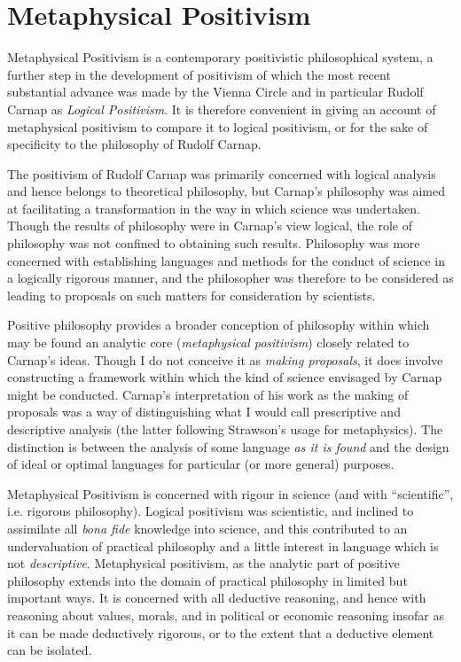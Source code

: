 
\chapter{Metaphysical Positivism}

Metaphysical Positivism is a contemporary positivistic philosophical system, a further step in the development of positivism of which the most recent substantial advance was made by the Vienna Circle and in particular Rudolf Carnap as \emph{Logical Positivism}.
It is therefore convenient in giving an account of metaphysical positivism to compare it to logical positivism, or for the sake of specificity to the philosophy of Rudolf Carnap.

The positivism of Rudolf Carnap was primarily concerned with logical analysis and hence belongs to theoretical philosophy, but Carnap's philosophy was aimed at facilitating a transformation in the way in which science was undertaken.
Though the results of philosophy were in Carnap's view logical, the role of philosophy was not confined to obtaining such results.
Philosophy was more concerned with establishing languages and methods for the conduct of science in a logically rigorous manner, and the philosopher was therefore to be considered as leading to proposals on such matters for consideration by scientists.

Positive philosophy provides a broader conception of philosophy within which may be found an analytic core (\emph{metaphysical positivism}) closely related to Carnap's ideas.
Though I do not conceive it as \emph{making proposals}, it does involve constructing a framework within which  the kind of science envisaged by Carnap might be conducted.
Carnap's interpretation of his work as the making of proposals was a way of distinguishing what I would call prescriptive and descriptive analysis (the latter following Strawson's usage for metaphysics).
The distinction is between the analysis of some language \emph{as it is found} and the design of ideal or optimal languages for particular (or more general) purposes.

Metaphysical Positivism is concerned with rigour in science (and with ``scientific'', i.e. rigorous philosophy).
Logical positivism was scientistic, and inclined to assimilate all {\it bona fide} knowledge into science, and this contributed to an undervaluation of practical philosophy and a little interest in language which is not \emph{descriptive}.
Metaphysical positivism, as the analytic part of positive philosophy extends into the domain of practical philosophy in limited but important ways.
It is concerned with all deductive reasoning, and hence with reasoning about values, morals, and in political or economic reasoning insofar as it can be made deductively rigorous, or to the extent that a deductive element can be isolated.


